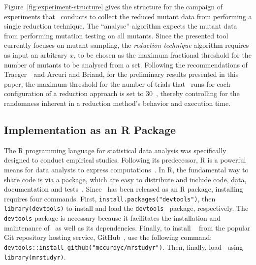 Figure~\ref{fig:experiment-structure} gives the structure for the campaign of experiments that \mr~conducts to collect
the reduced mutant data from performing a single reduction technique. The ``analyse'' algorithm expects the mutant data
from performing mutation testing on all mutants. Since the presented tool currently focuses on mutant sampling, the
\textit{reduction technique} algorithm requires as input an arbitrary $x$, to be chosen as the maximum fractional threshold
for the number of mutants to be analysed from a set. Following the recommendations of Traeger~\etal~and Arcuri and Briand,
for the preliminary results presented in this paper, the maximum threshold for the number of trials that \mr~runs for each
configuration of a reduction approach is set to 30~\cite{traeger2008nine, arcuri2014hitchhiker}, thereby controlling for
the randomness inherent in a reduction method's behavior and execution time.

\subsection{Implementation as an R Package}

The R programming language for statistical data analysis was specifically designed to conduct empirical studies.
Following its predecessor, R is a powerful means for data analysts to express
computations~\cite{ihaka1996r}.  In R, the fundamental way to share code is via a package, which are  easy to
distribute and include code, data, documentation and tests~\cite{wickham2015r}.  Since \mr~has been released as an R
package, installing requires four commands.  First, \texttt{install.packages("devtools")},
then {\small\texttt{library(devtools)}} to install and load the {\small\texttt{devtools}}~\cite{devtools} package,
respectively.  The \texttt{devtools} package is necessary because it facilitates the installation and maintenance of
\mr~as well as its dependencies. Finally, to install \mr~\cite{tool} from the popular Git repository hosting service,
GitHub~\cite{github}, use the following command: {\small\texttt{devtools::install\_github("mccurdyc/mrstudyr")}}.  Then,
finally, load \mr~using \texttt{library(mrstudyr)}.


